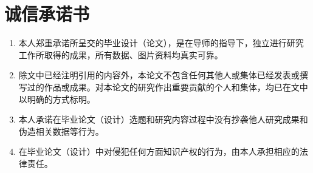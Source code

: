 \chapter*{诚信承诺书}
\label{chap:honest}

\begin{enumerate}
\item 本人郑重承诺所呈交的毕业设计（论文），是在导师的指导下，独立进行研究工作所取得的成果，所有数据、图片资料均真实可靠。
\item 除文中已经注明引用的内容外，本论文不包含任何其他人或集体已经发表或撰写过的作品或成果。对本论文的研究作出重要贡献的个人和集体，均已在文中以明确的方式标明。
\item 本人承诺在毕业论文（设计）选题和研究内容过程中没有抄袭他人研究成果和伪造相关数据等行为。
\item 在毕业论文（设计）中对侵犯任何方面知识产权的行为，由本人承担相应的法律责任。
\end{enumerate}

\baselineskip




